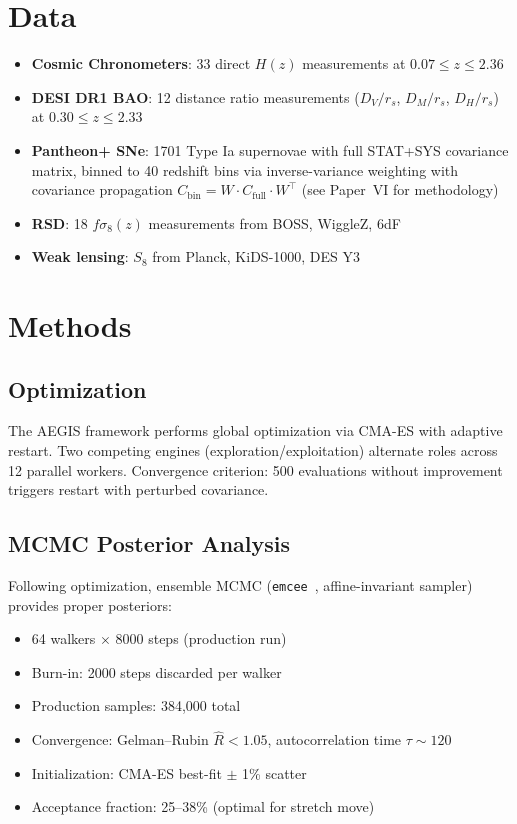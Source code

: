 \documentclass[twocolumn,prd,superscriptaddress,nofootinbib]{revtex4-2}
\begin{document}
\section{Data}
\label{sec:data}

\begin{itemize}
\item \textbf{Cosmic Chronometers}: 33 direct $H(z)$ measurements at $0.07 \leq z \leq 2.36$ \cite{Moresco2016,Simon2005}
\item \textbf{DESI DR1 BAO}: 12 distance ratio measurements ($D_V/r_s$, $D_M/r_s$, $D_H/r_s$) at $0.30 \leq z \leq 2.33$ \cite{DESI2024}
\item \textbf{Pantheon+ SNe}: 1701 Type Ia supernovae with full STAT+SYS covariance matrix, binned to 40 redshift bins via inverse-variance weighting with covariance propagation $C_\text{bin} = W \cdot C_\text{full} \cdot W^\top$ (see Paper~VI for methodology) \cite{Scolnic2022}
\item \textbf{RSD}: 18 $f\sigma_8(z)$ measurements from BOSS, WiggleZ, 6dF \cite{Blake2012}
\item \textbf{Weak lensing}: $S_8$ from Planck, KiDS-1000, DES Y3 \cite{Planck2020,KiDS2021,DESY3}
\end{itemize}

\section{Methods}
\label{sec:methods}

\subsection{Optimization}

The AEGIS framework performs global optimization via CMA-ES with adaptive restart. Two competing engines (exploration/exploitation) alternate roles across 12 parallel workers. Convergence criterion: 500 evaluations without improvement triggers restart with perturbed covariance.

\subsection{MCMC Posterior Analysis}

Following optimization, ensemble MCMC (\texttt{emcee}~\cite{Foreman-Mackey2013}, affine-invariant sampler) provides proper posteriors:
\begin{itemize}
\item 64 walkers $\times$ 8000 steps (production run)
\item Burn-in: 2000 steps discarded per walker
\item Production samples: 384,000 total
\item Convergence: Gelman--Rubin $\hat{R} < 1.05$, autocorrelation time $\tau \sim 120$
\item Initialization: CMA-ES best-fit $\pm$ 1\% scatter
\item Acceptance fraction: 25--38\% (optimal for stretch move)
\end{itemize}
\end{document}
